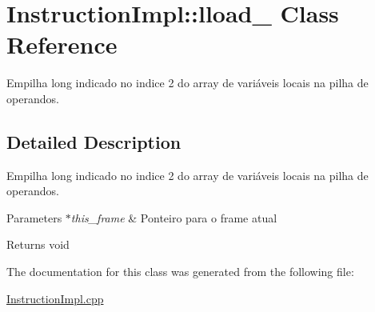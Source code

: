 \hypertarget{class_instruction_impl_1_1lload__2}{}\section{Instruction\+Impl\+:\+:lload\+\_ Class Reference}
\label{class_instruction_impl_1_1lload__2}


Empilha long indicado no indice 2 do array de variáveis locais na pilha de operandos.  




\subsection{Detailed Description}
Empilha long indicado no indice 2 do array de variáveis locais na pilha de operandos. 


\begin{DoxyParams}{Parameters}
{\em $\ast$this\+\_\+frame} & Ponteiro para o frame atual \\
\hline
\end{DoxyParams}
\begin{DoxyReturn}{Returns}
void 
\end{DoxyReturn}


The documentation for this class was generated from the following file\+:\begin{DoxyCompactItemize}
\item 
\hyperlink{_instruction_impl_8cpp}{Instruction\+Impl.\+cpp}\end{DoxyCompactItemize}
